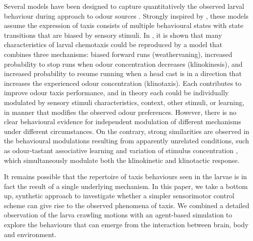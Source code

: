 \documentclass[10pt,a4paper]{article}
\begin{document}
Several models have been designed to capture quantitatively the observed larval behaviour during approach to odour sources  \citep{davies2015model,hernandez2015reverse,schleyer2015learning,gepner2015computations}. Strongly  inspired by
 \citep{lahiri2011two,gomez2014multilevel,gomez2011active}, these models assume the expression of taxis consists of multiple behavioural states with state transitions that are biased by sensory stimuli. In \cite{davies2015model}, it is shown that many characteristics of larval chemotaxis could be reproduced by a model that combines three mechanisms: biased forward runs (weathervaning), increased probability to stop runs when odour concentration decreases (klinokinesis), and increased probability to resume running when a head cast is in a direction that increases the experienced odour concentration (klinotaxis). Each contributes to improve odour taxis performance, and in theory each could be individually modulated by sensory stimuli characteristics, context, other stimuli, or learning, in manner that modifies the observed odour preferences. However, there is no clear behavioural evidence for independent modulation of different mechanisms under different circumstances. On the contrary, strong similarities are observed in the behavioural modulations resulting from apparently unrelated conditions, such as odour-tastant associative learning and variation of stimulus concentration \citep{schleyer2015learning}, which simultaneously modulate both the klinokinetic and klinotactic response.

It remains possible that the repertoire of taxis behaviours seen in the larvae is in fact the result of a single underlying mechanism. In this paper, we take a bottom up, synthetic approach \citep{braitenberg1986vehicles} to investigate whether a simpler sensorimotor control scheme can give rise to the observed phenomena of taxis. We combined a detailed observation of the larva crawling motions with an agent-based simulation to explore the behaviours that can emerge from the interaction between brain, body and environment.

\end{document}
